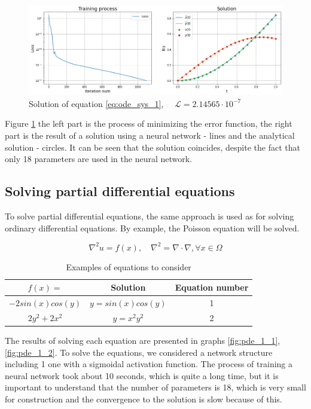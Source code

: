 \begin{figure}[h]
	\centering
	\includegraphics[width=1 \textwidth]{images/chapter2/ode_sys_1_res.png}
	\caption{Solution of equation \eqref{eq:ode_sys_1}, $\quad \mathcal{L} = 2.14565 \cdot 10^{-7} $ }
	\label{fig:ode_sys_1_res}
\end{figure}

Figure \ref{fig:ode_sys_1_res} the left part is the process of minimizing the error function, the right part is the result of a solution using a neural network - lines and the analytical solution - circles. It can be seen that the solution coincides, despite the fact that only 18 parameters are used in the neural network.

\subsection*{Solving partial differential equations}

To solve partial differential equations, the same approach is used as for solving ordinary differential equations. By example, the Poisson equation will be solved.

\begin{equation*}
	\nabla^2 u = f(x), \quad \nabla^2 = \nabla \cdot \nabla, \forall x \in \Omega
\end{equation*}

\begin{table}[h]
	\centering
	\begin{tabular}{| c | c | c |} 
		\hline
		$f(x) = $ & Solution & Equation number \\ \hline
		$ -2 sin(x) cos(y) $ & $ y = sin(x) cos(y) $ & 1\\
		$ 2 y^2 + 2 x^2 $ & $ y = x^2 y^2 $ & 2\\ \hline
	\end{tabular}
	\caption{Examples of equations to consider}
	\label{table:pde1_tab}
\end{table}

The results of solving each equation are presented in graphs \ref{fig:pde_1_1}, \ref{fig:pde_1_2}. To solve the equations, we considered a network structure including 1 one with a sigmoidal activation function. The process of training a neural network took about 10 seconds, which is quite a long time, but it is important to understand that the number of parameters is 18, which is very small for construction and the convergence to the solution is slow because of this.

